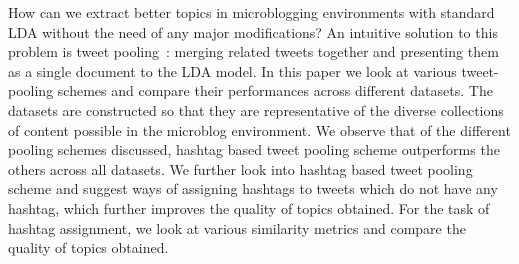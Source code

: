\documentclass[10pt,a5paper,twoside]{article}
\begin{document}
How can we extract better topics in
microblogging environments with standard LDA without the need of any
major modifications?  An intuitive solution to this problem is tweet
pooling~\cite{Weng2010wsdm}: merging related tweets together and presenting them as a
single document to the LDA model.  
In this paper we look at various tweet-pooling schemes and compare
their performances across different datasets. The datasets are
constructed so that they are representative of the diverse
collections of content possible in the microblog environment.
We observe that of the different pooling schemes discussed, hashtag
based tweet pooling scheme outperforms the others across all
datasets. We further look into hashtag based tweet pooling scheme and
suggest ways of assigning hashtags to tweets which do not have any
hashtag, which further improves the quality of topics obtained. For
the task of hashtag assignment, we look at various similarity metrics
and compare the quality of topics obtained.
\end{document}
